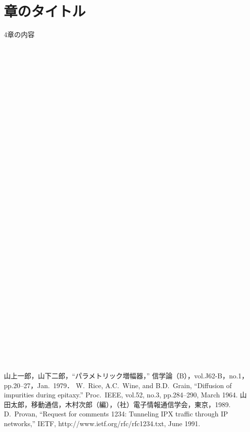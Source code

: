 ﻿\documentclass[twocolumn,a4j]{jarticle}
\begin{document}
\section{章のタイトル}
4章の内容
\\
\\
\\
\\
\\
\\
\\
\\
\\
\\
\\
\\
\\
\\
\\
\\
\\
\\
\\
\\
\\
\\
\\
\\
\\
\\
\\
\\
\\
\\
\\
\\
\\
\\
\\

\begin{thebibliography}{9}\setlength{\itemsep}{-2pt}
   山上一郎，山下二郎，``パラメトリック増幅器，'' 信学論（B），vol.J62-B，no.1，pp.20--27，Jan.\ 1979．
   W.~Rice, A.C.~Wine, and B.D.~Grain, ``Diffusion of impurities during epitaxy.'' Proc.\ IEEE, vol.52, no.3, pp.284--290, March 1964.
   山田太郎，移動通信，木村次郎（編），（社）電子情報通信学会，東京，1989.
   D.~Provan, ``Request for comments 1234: Tunneling IPX traffic through IP networks,'' IETF, http://www.ietf.org/rfc/rfc1234.txt, June 1991.
\end{thebibliography}
\end{document}
